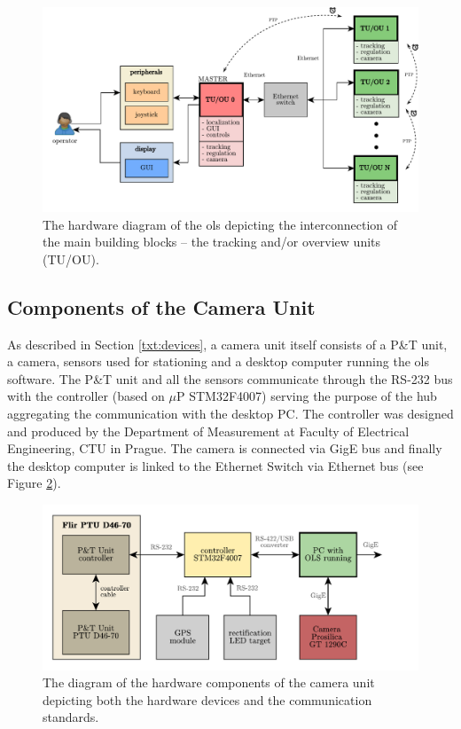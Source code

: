 \begin{figure}[htb]
	\centering
	\includegraphics[width=0.9\linewidth]{fig/hwsw_architecture.pdf}
	\caption{The hardware diagram of the \gls{ols} depicting the interconnection of the main building blocks -- the tracking and/or overview units (TU/OU).}
	\label{fig:hw_ols}
\end{figure}

\subsection{Components of the Camera Unit} \label{txt:components_of_cu}

As described in Section \ref{txt:devices}, a camera unit itself consists of a P\&T unit, a camera, sensors used for stationing and a desktop computer running the \gls{ols} software. The P\&T unit and all the sensors communicate through the RS-232 bus with the controller (based on $\mu$P STM32F4007) serving the purpose of the hub aggregating the communication with the desktop PC. The controller was designed and produced by the Department of Measurement at Faculty of Electrical Engineering, CTU in Prague. The camera is connected via GigE bus and finally the desktop computer is linked to the Ethernet Switch via Ethernet bus (see Figure \ref{fig:hw_camera_unit}).

\begin{figure}[htb]
	\centering
	\includegraphics[width=0.8\linewidth]{fig/hw_camera_unit.pdf}
	\caption{The diagram of the hardware components of the camera unit depicting both the hardware devices and the communication standards.}
	\label{fig:hw_camera_unit}
\end{figure}

